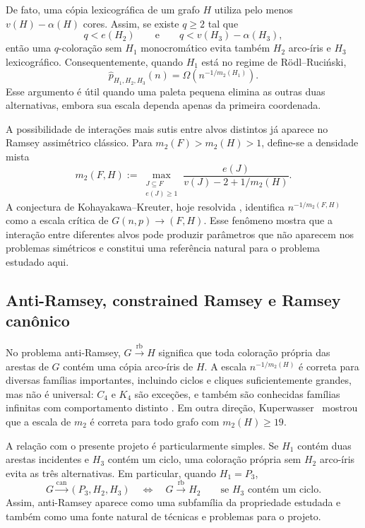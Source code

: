 \documentclass[11pt,a4paper]{article}
\newcommand{\can}{\stackrel{\mathrm{can}}{\longrightarrow}}
\newcommand{\rb}{\stackrel{\mathrm{rb}}{\longrightarrow}}
\newcommand{\Gnp}{G(n,p)}
\theoremstyle{plain}
\theoremstyle{definition}
\begin{document}
De fato, uma cópia lexicográfica de um grafo $H$ utiliza pelo menos
$v(H)-\alpha(H)$
cores. Assim, se existe $q\ge2$ tal que
\[
  q<e(H_2)
  \qquad\text{e}\qquad
  q<v(H_3)-\alpha(H_3),
\]
então uma $q$-coloração sem $H_1$ monocromático evita também
$H_2$ arco-íris e $H_3$ lexicográfico. Consequentemente, quando
$H_1$ está no regime de Rödl--Ruciński,
\[
  \widehat p_{H_1,H_2,H_3}(n)
  =
  \Omega\!\left(n^{-1/m_2(H_1)}\right).
\]
Esse argumento é útil quando uma paleta pequena elimina as outras
duas alternativas, embora sua escala dependa apenas da primeira
coordenada.

A possibilidade de interações mais sutis entre alvos distintos já
aparece no Ramsey assimétrico clássico. Para
$m_2(F)>m_2(H)>1$, define-se a densidade mista
\[
  m_2(F,H)
  :=
  \max_{\substack{J\subseteq F\\e(J)\ge1}}
  \frac{e(J)}
  {v(J)-2+1/m_2(H)}.
\]
A conjectura de Kohayakawa--Kreuter, hoje resolvida
\cite{MNS,BHH,KSW,CMSW}, identifica
$n^{-1/m_2(F,H)}$
como a escala crítica de $\Gnp\longrightarrow(F,H)$. Esse fenômeno
mostra que a interação entre diferentes alvos pode produzir parâmetros
que não aparecem nos problemas simétricos e constitui uma referência
natural para o problema estudado aqui.


\subsection{Anti-Ramsey, constrained Ramsey e Ramsey canônico}


No problema anti-Ramsey, $G\rb H$ significa que toda coloração
própria das arestas de $G$ contém uma cópia arco-íris de $H$.
A escala $n^{-1/m_2(H)}$ é correta para diversas famílias importantes,
incluindo ciclos e cliques suficientemente grandes, mas não é
universal: $C_4$ e $K_4$ são exceções, e também são conhecidas
famílias infinitas com comportamento distinto
\cite{KKM,BCMP,KMPS,KKM2,AMMMM}. Em outra direção,
Kuperwasser~\cite{Kup} mostrou que a escala de $m_2$ é correta para
todo grafo com $m_2(H)\ge19$.

A relação com o presente projeto é particularmente simples.
Se $H_1$ contém duas arestas incidentes e $H_3$ contém um ciclo,
uma coloração própria sem $H_2$ arco-íris evita as três alternativas.
Em particular, quando $H_1=P_3$,
\[
  G\can(P_3,H_2,H_3)
  \quad\Longleftrightarrow\quad
  G\rb H_2
  \qquad\text{se $H_3$ contém um ciclo}.
\]
Assim, anti-Ramsey aparece como uma subfamília da propriedade estudada
e também como uma fonte natural de técnicas e problemas para o projeto.
\end{document}
